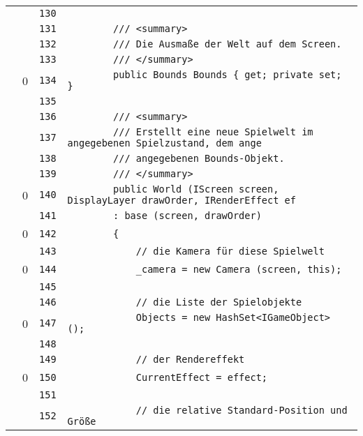\documentclass[a4paper,10pt]{article}
\begin{document}
\begin{longtable}[l]{lrrl}
\cellcolor{gray} &  & \verb~130~ & \verb~~\\
\cellcolor{gray} &  & \verb~131~ & \verb~        /// <summary>~\\
\cellcolor{gray} &  & \verb~132~ & \verb~        /// Die Ausmaße der Welt auf dem Screen.~\\
\cellcolor{gray} &  & \verb~133~ & \verb~        /// </summary>~\\
\cellcolor{red} & 0 & \verb~134~ & \verb~        public Bounds Bounds { get; private set; }~\\
\cellcolor{gray} &  & \verb~135~ & \verb~~\\
\cellcolor{gray} &  & \verb~136~ & \verb~        /// <summary>~\\
\cellcolor{gray} &  & \verb~137~ & \verb~        /// Erstellt eine neue Spielwelt im angegebenen Spielzustand, dem ange~\\
\cellcolor{gray} &  & \verb~138~ & \verb~        /// angegebenen Bounds-Objekt.~\\
\cellcolor{gray} &  & \verb~139~ & \verb~        /// </summary>~\\
\cellcolor{red} & 0 & \verb~140~ & \verb~        public World (IScreen screen, DisplayLayer drawOrder, IRenderEffect ef~\\
\cellcolor{gray} &  & \verb~141~ & \verb~        : base (screen, drawOrder)~\\
\cellcolor{red} & 0 & \verb~142~ & \verb~        {~\\
\cellcolor{gray} &  & \verb~143~ & \verb~            // die Kamera für diese Spielwelt~\\
\cellcolor{red} & 0 & \verb~144~ & \verb~            _camera = new Camera (screen, this);~\\
\cellcolor{gray} &  & \verb~145~ & \verb~~\\
\cellcolor{gray} &  & \verb~146~ & \verb~            // die Liste der Spielobjekte~\\
\cellcolor{red} & 0 & \verb~147~ & \verb~            Objects = new HashSet<IGameObject> ();~\\
\cellcolor{gray} &  & \verb~148~ & \verb~~\\
\cellcolor{gray} &  & \verb~149~ & \verb~            // der Rendereffekt~\\
\cellcolor{red} & 0 & \verb~150~ & \verb~            CurrentEffect = effect;~\\
\cellcolor{gray} &  & \verb~151~ & \verb~~\\
\cellcolor{gray} &  & \verb~152~ & \verb~            // die relative Standard-Position und Größe~\\

\end{longtable}
\end{document}
